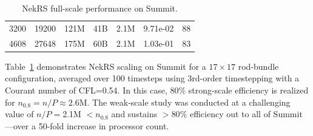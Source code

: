 \begin{table}[b]
\begin{tabular}{|c|c|c|c|c|c|r|}
 3200 & 19200 & 121M      & 41B   &  2.1M  & 9.71e-02  & 88    \\%
 4608 & 27648 & 175M      & 60B   &  2.1M  & 1.03e-01  & 83    \\%
 \hline
 \end{tabular}
 \caption{\small\label{rod-strong-weak} NekRS full-scale performance on Summit.}
\end{table}

Table~\ref{rod-strong-weak} demonstrates NekRS scaling on Summit for a
$17 \times 17$ rod-bundle configuration, averaged over 100 timesteps
using 3rd-order timestepping with a Courant number of CFL=0.54.
In this case, 80\% strong-scale efficiency is realized for
$n_{0.8} = n/P \approx 2.6$M.  The weak-scale study was conducted at a
challenging value of $n/P = $2.1M $< n_{0.8}$ and sustains $> 80\%$
efficiency out to all of Summit---over a 50-fold increase in processor count.


